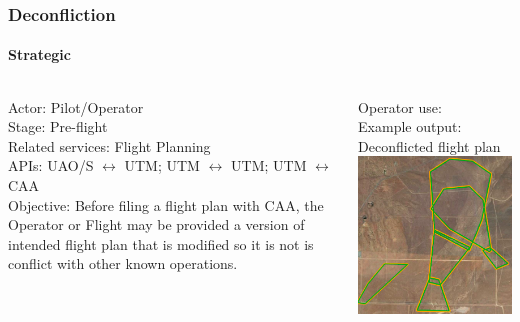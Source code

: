 \documentclass[usenames,dvipsnames,aspectratio=169,serif]{beamer}
\begin{document}

\begin{frame}
   \frametitle{Deconfliction}
   \framesubtitle{Strategic}
   \begin{columns}[t]
      \begin{column}{0.5\textwidth}
         Actor: Pilot/Operator \\
         Stage: Pre-flight \\
         Related services: Flight Planning \\
         APIs: UAO/S $\leftrightarrow$ UTM; UTM $\leftrightarrow$ UTM; UTM $\leftrightarrow$ CAA \\

         Objective: Before filing a flight plan with CAA, the Operator or Flight may be provided a version of intended flight plan that is modified so it is not is conflict with other known operations.
      \end{column}
      \begin{column}{0.5\textwidth}

         Operator use: \\
         Example output: Deconflicted flight plan \\
         \includegraphics[height=0.45\textwidth]{img/strategic-deconfliction.png}
      \end{column}
   \end{columns}
\end{frame}
\end{document}
